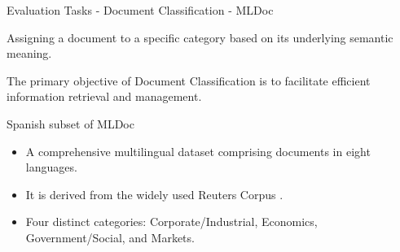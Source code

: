 \documentclass[aspectratio=169,xcolor=dvipsnames]{beamer}
\newenvironment{wideitemize}{\itemize\addtolength{\itemsep}{10pt}}{\enditemize}
\begin{document}
\begin{frame}{Evaluation Tasks - Document Classification - MLDoc}

\begin{wideitemize}
    \item Assigning a document to a specific category based on its underlying semantic meaning. 
    \item The primary objective of Document Classification is to facilitate efficient information retrieval and management. 
    \item Spanish subset of MLDoc \citep{schwenk-li-2018-corpus}
    \begin{itemize}
        \item A comprehensive multilingual dataset comprising documents in eight languages.
        \item It is derived from the widely used Reuters Corpus \citep{reuters-DBLP:journals/jmlr/LewisYRL04}.
        \item Four distinct categories: Corporate/Industrial, Economics, Government/Social, and Markets.
    \end{itemize}
\end{wideitemize}

\end{frame}
\end{document}
